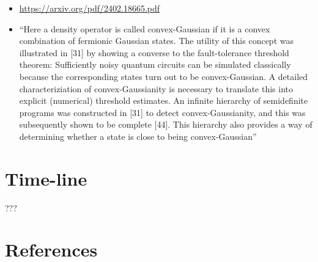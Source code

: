 \documentclass[11pt]{article}
\begin{document}
\begin{itemize}
\item \url{https://arxiv.org/pdf/2402.18665.pdf}
\item ``Here a density operator is called convex-Gaussian if it is a convex
combination of fermionic Gaussian states. The utility of this concept was
illustrated in [31] by showing a converse to the fault-tolerance threshold
theorem: Sufficiently noisy quantum circuits can be simulated classically
because the corresponding states turn out to be convex-Gaussian. A detailed
characteriziation of convex-Gaussianity is necessary to translate this into
explicit (numerical) threshold estimates. An infinite hierarchy of
semidefinite programs was constructed in [31] to detect convex-Gaussianity,
and this was subsequently shown to be complete [44]. This hierarchy also
provides a way of determining whether a state is close to being
convex-Gaussian''
\end{itemize}
\section{Time-line}
\label{sec:org937c1c6}
???
\section{References}
\label{sec:org9067e50}
\end{document}
